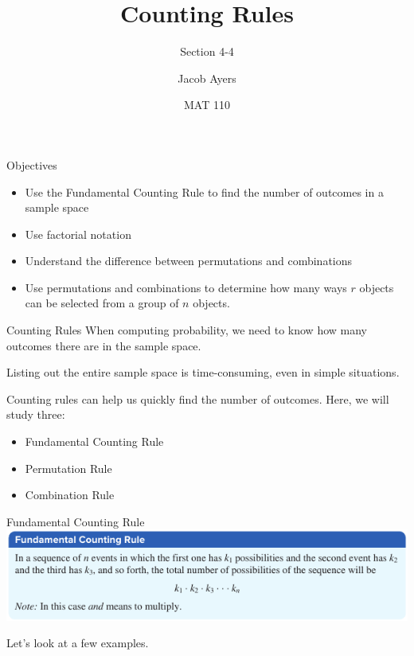 \documentclass[t, aspectratio=169]{beamer}
\title[4-4]{Counting Rules}
\subtitle{Section 4-4}
\author{Jacob Ayers}
\institute{Lesson \#12}
\date{MAT 110}
\newcommand{\?}{\stackrel{?}{=}}
\begin{document}
	
	\begin{frame}
		\titlepage
	\end{frame}
	
	\begin{frame}{Objectives}
		\begin{itemize}
			\item Use the Fundamental Counting Rule to find the number of outcomes in a sample space
			\item Use factorial notation
			\item Understand the difference between permutations and combinations
			\item Use permutations and combinations to determine how many ways $r$ objects can be selected from a group of $n$ objects.
		\end{itemize}
	\end{frame}

	\begin{frame}{Counting Rules}
		When computing probability, we need to know how many outcomes there are in the sample space. \pause
		
		Listing out the entire sample space is time-consuming, even in simple situations. \pause
		
		Counting rules can help us quickly find the number of outcomes. Here, we will study three: \begin{itemize}
			\item Fundamental Counting Rule \pause
			\item Permutation Rule \pause
			\item Combination Rule
		\end{itemize}
	\end{frame}

	\begin{frame}{Fundamental Counting Rule}
		\includegraphics[width=\textwidth]{fcr.png} \pause
		
		Let's look at a few examples.
	\end{frame}
\end{document}
